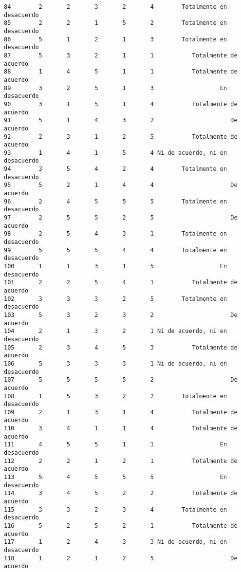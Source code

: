 \documentclass[
  letterpaper,
  DIV=11,
  numbers=noendperiod]{scrartcl}
\begin{document}
\begin{verbatim}
84        2       2       3       2       4        Totalmente en desacuerdo
85        2       2       1       5       2        Totalmente en desacuerdo
86        5       1       2       1       3        Totalmente en desacuerdo
87        5       3       2       1       1           Totalmente de acuerdo
88        1       4       5       1       1           Totalmente de acuerdo
89        3       2       5       1       3                   En desacuerdo
90        3       1       5       1       4           Totalmente de acuerdo
91        5       1       4       3       2                      De acuerdo
92        2       3       1       2       5           Totalmente de acuerdo
93        1       4       1       5       4 Ni de acuerdo, ni en desacuerdo
94        3       5       4       2       4        Totalmente en desacuerdo
95        5       2       1       4       4                      De acuerdo
96        2       4       5       5       5        Totalmente en desacuerdo
97        2       5       5       2       5                      De acuerdo
98        2       5       4       3       1        Totalmente en desacuerdo
99        5       5       5       4       4        Totalmente en desacuerdo
100       1       1       3       1       5                   En desacuerdo
101       2       2       5       4       1           Totalmente de acuerdo
102       3       3       3       2       5        Totalmente en desacuerdo
103       5       3       2       3       2                      De acuerdo
104       2       1       3       2       1 Ni de acuerdo, ni en desacuerdo
105       2       3       4       5       3           Totalmente de acuerdo
106       5       3       3       3       1 Ni de acuerdo, ni en desacuerdo
107       5       5       5       5       2                      De acuerdo
108       1       5       3       2       2        Totalmente en desacuerdo
109       2       1       3       1       4           Totalmente de acuerdo
110       3       4       1       1       4           Totalmente de acuerdo
111       4       5       5       1       1                   En desacuerdo
112       2       2       1       2       1           Totalmente de acuerdo
113       5       4       5       5       5                   En desacuerdo
114       3       4       5       2       2           Totalmente de acuerdo
115       3       3       2       3       4        Totalmente en desacuerdo
116       5       2       5       2       1           Totalmente de acuerdo
117       1       2       4       3       3 Ni de acuerdo, ni en desacuerdo
118       1       2       1       2       5                      De acuerdo

\end{verbatim}
\end{document}
